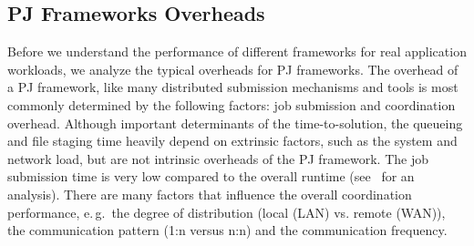 \documentclass[conference]{IEEEtran}
\begin{document}

\subsection{PJ Frameworks Overheads}\label{sec:pj_performance}



Before we understand the performance of different frameworks for
real application workloads, we analyze the typical overheads for PJ
frameworks.
The overhead of a PJ framework, like many distributed
submission mechanisms and tools is most commonly determined by the
following factors: job submission and coordination overhead.  Although
important determinants of the time-to-solution, the queueing and file
staging time heavily depend on extrinsic factors, such as the system
and network load, but are not intrinsic overheads of the PJ framework.
The job submission time is very low compared to the overall runtime
(see~\cite{saga_europar10} for an analysis).  There are many factors
that influence the overall coordination performance, e.\,g.\ the
degree of distribution (local (LAN) vs. remote (WAN)), the
communication pattern (1:n versus n:n) and the communication
frequency.
\end{document}
